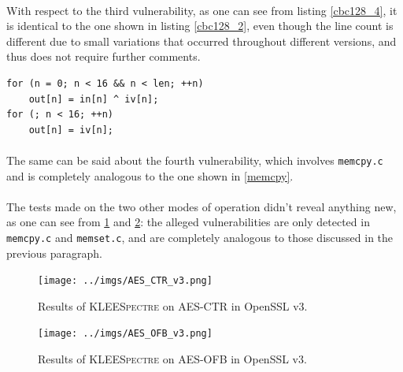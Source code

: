 \documentclass[12pt,a4paper]{book}
\theoremstyle{definition}
\begin{document}
	\paragraph{} With respect to the third vulnerability, as one can see from listing \ref{cbc128_4}, it is identical to the one shown in listing \ref{cbc128_2}, even though the line count is different due to small variations that occurred throughout different versions, and thus does not require further comments.

	\begin{minipage}{.5\textwidth}
		\begin{lstlisting}[caption={\texttt{cbc128.c}}, label=cbc128_4, firstnumber=60]
for (n = 0; n < 16 && n < len; ++n)
	out[n] = in[n] ^ iv[n];
for (; n < 16; ++n)
	out[n] = iv[n];
		\end{lstlisting}
	\end{minipage}

	\paragraph{} The same can be said about the fourth vulnerability, which involves \texttt{memcpy.c} and is completely analogous to the one shown in \ref{memcpy}.
	
	\paragraph{} The tests made on the two other modes of operation didn't reveal anything new, as one can see from \ref{fig:result_ctr_v3} and \ref{fig:result_ofb_v3}: the alleged vulnerabilities are only detected in \texttt{memcpy.c} and \texttt{memset.c}, and are completely analogous to those discussed in the previous paragraph.

	\begin{figure}[!ht]
		\centering
		\texttt{[image: ../imgs/AES\_CTR\_v3.png]}
		\captionsetup{width=.8\linewidth}
		\caption{Results of \textsc{KLEESpectre} on AES-CTR in OpenSSL v3.}
		\label{fig:result_ctr_v3}
	\end{figure}

	\begin{figure}[!ht]
		\centering
		\texttt{[image: ../imgs/AES\_OFB\_v3.png]}
		\captionsetup{width=.8\linewidth}
		\caption{Results of \textsc{KLEESpectre} on AES-OFB in OpenSSL v3.}
		\label{fig:result_ofb_v3}
	\end{figure}
\end{document}
